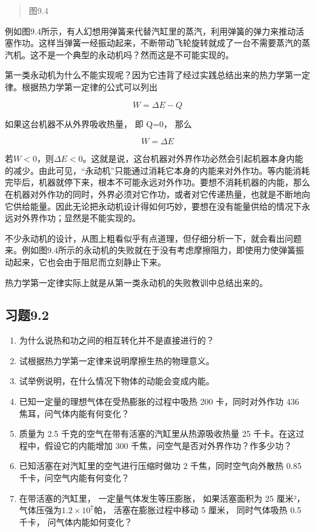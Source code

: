 \begin{quote}
图9.4
\end{quote}

例如图9.4所示，有人幻想用弹簧来代替汽缸里的蒸汽，利用弹簧的弹力来推动活塞作功。这样当弹簧一经振动起来，不断带动飞轮旋转就成了一台不需要蒸汽的蒸汽机。这不是一个典型的永动机吗？然而这是不可能实现的。

第一类永动机为什么不能实现呢？因为它违背了经过实践总结出来的热力学第一定律。根据热力学第一定律的公式可以列出

\[
W=\Delta E-Q
\]

如果这台机器不从外界吸收热量， 即 Q=0， 那么

\[
W = \Delta E
\]

若\(W < 0\)，则\(\Delta E < 0\)。这就是说，这台机器对外界作功必然会引起机器本身内能的减少。由此可见，``永动机''只能通过消耗它本身的内能来对外作功。等内能消耗完毕后，机器就停下来，根本不可能永远对外作功。要想不消耗机器的内能，那么在机器对外作功的同时，外界必须对它作功，或者对它传递热量，也就是不断地向它供给能量。因此无论把永动机设计得如何巧妙，要想在没有能量供给的情况下永远对外界作功；显然是不能实现的。

不少永动机的设计，从图上粗看似乎有点道理，但仔细分析一下，就会看出问题来。例如图9.4所示的永动机的失败就在于没有考虑摩擦阻力，即使用力使弹簧振动起来，它也会由于阻尼而立刻静止下来。

热力学第一定律实际上就是从第一类永动机的失败教训中总结出来的。

\subsection{习题9.2}\label{ux4e60ux98989.2}

\begin{enumerate}
\def\labelenumi{\arabic{enumi}.}
\item
  为什么说热和功之间的相互转化并不是直接进行的？
\item
  试根据热力学第一定律来说明摩擦生热的物理意义。
\item
  试举例说明，在什么情况下物体的动能会变成内能。
\item
  已知一定量的理想气体在受热膨胀的过程中吸热 200 卡，同时对外作功 436
  焦耳，问气体内能有何变化？
\item
  质量为 2.5 千克的空气在带有活塞的汽缸里从热源吸收热量 25
  千卡。在这过程中，假设它的内能增加 300
  千焦，问空气是否对外界作功？作多少功？
\item
  已知活塞在对汽缸里的空气进行压缩时做功 2 千焦，同时空气向外散热 0.85
  千卡，问空气内能有何变化？
\item
  在带活塞的汽缸里， 一定量气体发生等压膨胀， 如果活塞面积为 25 厘米²，
  气体压强为\(1.2 \times 10^{7}\)帕， 活塞在膨胀过程中移动 5 厘米，
  同时气体吸热 0.5 千卡， 问气体内能如何变化？
\end{enumerate}

